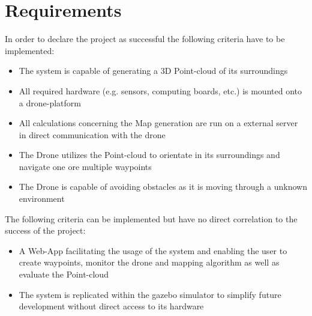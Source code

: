 \section{Requirements}
In order to declare the project as successful the following criteria have to be implemented:
\begin{itemize}
	\item The system is capable of generating a 3D Point-cloud of its surroundings
	\item All required hardware (e.g. sensors, computing boards, etc.) is mounted onto a drone-platform 
	\item All calculations concerning the Map generation are run on a external server in direct communication with the drone
	\item The Drone utilizes the Point-cloud to orientate in its surroundings and navigate one ore multiple waypoints
	\item The Drone is capable of avoiding obstacles as it is moving through a unknown environment
\end{itemize}

The following criteria can be implemented but have no direct correlation to the success of the project:
\begin{itemize}
	\item A Web-App facilitating the usage of the system and enabling the user to create waypoints, monitor the drone and mapping algorithm as well as evaluate the Point-cloud
	\item The system is replicated within the gazebo simulator to simplify future development without direct access to its hardware
\end{itemize}


\filbreak
